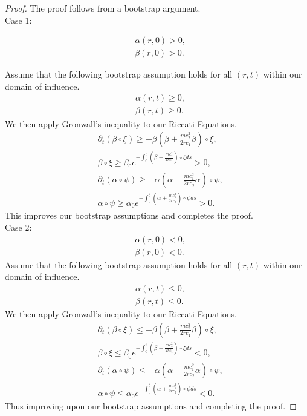 \documentclass[10pt,a4paper]{amsart}
\begin{document}
\begin{proof}
The proof follows from a bootstrap argument. 
\\
Case 1: 

\begin{align}
	&\alpha(r,0) > 0, 
	\\
	&\beta(r,0) > 0.
\end{align} 

Assume that the following bootstrap assumption holds for all $(r, t)$ within our domain of influence. 
\begin{align}
	&\alpha(r,t) \geq 0, 
	\\
	&\beta(r,t) \geq 0.
\end{align} 
We then apply Gronwall's inequality to our Riccati Equations. 
\begin{align}
	&\partial_t(\beta\circ\xi) \geq -\beta\left(\beta + \frac{mc_2^2}{2rc_1}\beta\right) \circ\xi, 
	\\
	&\beta\circ\xi \geq \beta_0 e^{-\int_0^t \left( \beta + \frac{mc_2^2}{2rc_1} \right)\circ\xi ds} > 0, 
	\\
	&\partial_t(\alpha\circ\psi) \geq -\alpha\left(\alpha + \frac{mc_1^2}{2rc_2}\alpha\right) \circ\psi, 
	\\
	&\alpha\circ\psi \geq \alpha_0 e^{-\int_0^t \left( \alpha + \frac{mc_1^2}{2rc_2} \right)\circ\psi ds} > 0. 
\end{align} 
This improves our bootstrap assumptions and completes the proof. 
\bigskip
\\
Case 2: 
\begin{align}
	&\alpha(r,0) < 0, 
	\\
	&\beta(r,0) < 0.
\end{align} 
Assume that the following bootstrap assumption holds for all $(r, t)$ within our domain of influence. 
\begin{align}
	&\alpha(r,t) \leq 0, 
	\\
	&\beta(r,t) \leq 0.
\end{align} 
We then apply Gronwall's inequality to our Riccati Equations. 
\begin{align}
	&\partial_t(\beta\circ\xi) \leq -\beta\left(\beta + \frac{mc_2^2}{2rc_1}\beta\right) \circ\xi, 
	\\
	&\beta\circ\xi \leq \beta_0 e^{-\int_0^t \left( \beta + \frac{mc_2^2}{2rc_1} \right)\circ\xi ds} < 0, 
	\\
	&\partial_t(\alpha\circ\psi) \leq -\alpha\left(\alpha + \frac{mc_1^2}{2rc_2}\alpha\right) \circ\psi, 
	\\
	&\alpha\circ\psi \leq \alpha_0 e^{-\int_0^t \left( \alpha + \frac{mc_1^2}{2rc_2} \right)\circ\psi ds} < 0. 
\end{align} 
Thus improving upon our bootstrap assumptions and completing the proof. 
\end{proof} 
\end{document}
